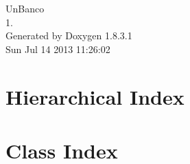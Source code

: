 \documentclass{article}
\begin{document}
\hypersetup{pageanchor=false,citecolor=blue}
\begin{titlepage}
\vspace*{7cm}
\begin{center}
{\Large Un\-Banco \\[1ex]\large 1. }\\
\vspace*{1cm}
{\large Generated by Doxygen 1.8.3.1}\\
\vspace*{0.5cm}
{\small Sun Jul 14 2013 11:26:02}\\
\end{center}
\end{titlepage}
\tableofcontents
{}
\hypersetup{pageanchor=true,citecolor=blue}
\section{Hierarchical Index}

\section{Class Index}

\end{document}
